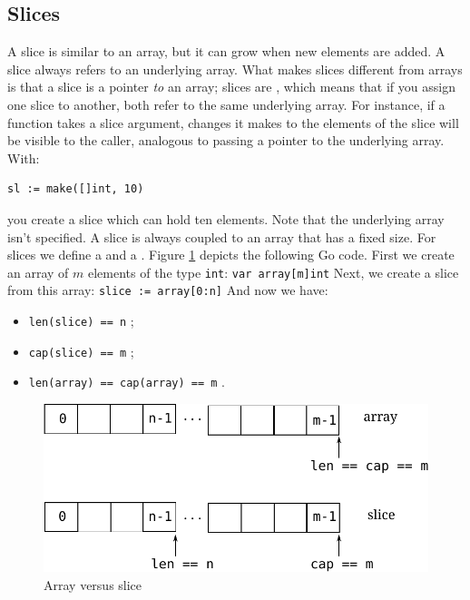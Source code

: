 \subsection{Slices}
\label{sec:slices}
A slice is similar to an array, but it can grow when new elements
are added.
A slice always refers to an underlying array. What makes slices different
from
arrays is that a slice is a pointer \emph{to} an array;
slices are , 
which means that if you assign one slice to
another, both refer to the same underlying array. For instance, if a
function takes a slice argument, changes it makes to the elements of the
slice will be visible to the caller, analogous to passing a pointer to
the underlying array. With:
\begin{lstlisting}
sl := make([]int, 10)
\end{lstlisting}
you create a slice which can hold ten elements. Note that the
underlying array isn't specified.
A slice is always coupled to an array that has
a fixed size. For slices we define a  and a
. 
Figure \ref{fig:array-vs-slice} depicts the following Go code.
First we create an array of $m$ elements of the type \lstinline{int}:
\lstinline{var array[m]int}\newline
Next, we create a slice from this array:
\lstinline{slice := array[0:n]}\newline
And now we have:
\begin{itemize}
\item{\lstinline{len(slice) == n}{} ;}
\item{\lstinline{cap(slice) == m}{} ;}
\item{\lstinline{len(array) == cap(array) == m}{} .}
\end{itemize}
\begin{figure}[H]
\caption{Array versus slice}
\label{fig:array-vs-slice}
\begin{center}
\includegraphics[scale=0.65]{fig/array-vs-slice.pdf}
\end{center}
\end{figure}

